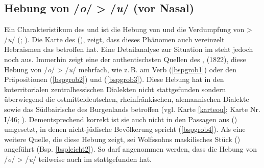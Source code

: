  \subsection{Hebung von /\textit{o}/ > /\textit{u}/ (vor Nasal)}\label{o_u} 

 Ein Charakteristikum des  und  ist die Hebung von  und die Verdumpfung von  > /\textit{u}/ (\cite[66]{Herzog1992}; \cite[28]{Beider2010}). Die Karte des  (\citeyear[66–68]{Herzog1992}), zeigt, dass dieses Phänomen auch vereinzelt Hebraismen das  betroffen hat. Eine Detailanalyse zur Situation im  steht jedoch noch aus. Immerhin zeigt eine der authentischsten Quellen des ,  (1822), diese Hebung von /\textit{o}/ > /\textit{u}/ mehrfach, wie z.\,B. am Verb  (\ref{bspgrob1}) oder den Präpositionen  (\ref{bspgrob2}) und  (\ref{bspgrob3}). Diese Hebung hat in den koterritorialen zentralhessischen Dialekten nicht stattgefunden sondern überwiegend die ostmitteldeutschen, rheinfränkischen, alemannischen Dialekte sowie das Südbairische des Burgenlands betroffen (vgl. Karte \ref{karteou};  Karte Nr. I/46;  ). Dementsprechend korrekt ist sie auch nicht in den Passagen aus  () umgesetzt, in denen nicht-jüdische Bevölkerung spricht (\ref{bspgrob4}). Als eine weitere Quelle, die diese Hebung zeigt, sei Wolfssohns maskilisches Stück   () angeführt (Bsp. \ref{bspleicht2}). So darf angenommen werden, dass die Hebung von /\textit{o}/ > /\textit{u}/ teilweise auch im  stattgefunden hat.\\

